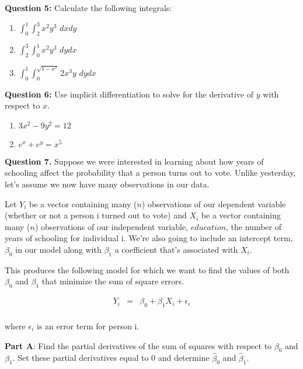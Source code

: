 \documentclass[10pt]{amsart}
\begin{document}
\medskip

\textbf{Question 5:} Calculate the following integrals:
\begin{enumerate}
\item $\int_{0}^1 \int_{2}^{3} x^2y^3 \,\, dxdy$
\item $\int_{2}^{3} \int_{0}^1 x^2y^3 \,\, dy dx$
\item $\int_{0}^1 \int_0^{\sqrt{1-x^2}} 2x^3y \, \, dy dx$
\end{enumerate}

\medskip

\textbf{Question 6:} Use implicit differentiation to solve for the derivative of $y$ with respect to $x$.

\begin{enumerate}
\item $3x^2 - 9y^2 = 12$
\item$ e^x +e^y = x^5$\\
\end{enumerate}

\medskip

\noindent \textbf{Question 7.} Suppose we were interested in learning about how years of schooling affect the probability that a person turns out to vote. Unlike yesterday, let's assume we now have many observations in our data. 

Let $Y_i$ be a vector containing many ($n$) observations of our dependent variable (whether or not a person i turned out to vote) and $X_i$ be a vector containing many ($n$) observations of our independent variable, $education$, the number of years of schooling for individual i. We're also going to include an intercept term, $\beta_0$ in our model along with $\beta_1$ a coefficient that's associated with $X_i$. 

This produces the following model for which we want to find the values of both $\beta_0$ and $\beta_1$ that minimize the sum of square errors. 

\bigskip
\begin{eqnarray*}
Y_i &=& \beta_0 + \beta_1 X_i + \epsilon_i\\
 \end{eqnarray*}

 where $\epsilon_i$ is an error term for person i.
 
\textbf{Part A}: Find the partial derivatives of the sum of squares with respect to $\beta_0$ and $\beta_1$. Set these partial derivatives equal to 0 and determine $\hat \beta_0$ and $\hat \beta_1$. 
 
\end{document}
